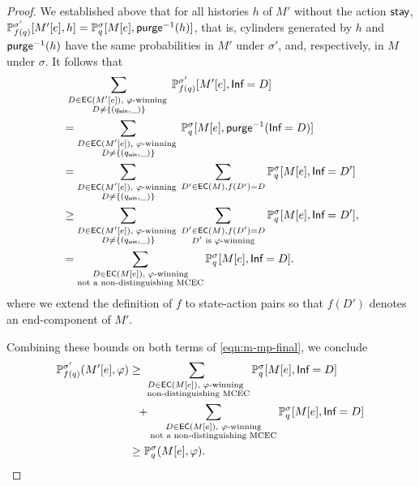 \documentclass[a4paper,USenglish,cleveref, autoref, thm-restate]{lipics-v2021}
\newcommand*{\pr}{\mathbb{P}}
\newcommand\ecs{\textrm{\sf EC}}
\newcommand\Inf{\textrm{\sf Inf}}
\def\winabsorb{q_{\sf win}}
\newcommand\purgeinv[1]{\textrm{\sf purge}^{-1}(#1)}
\def\actionstay{\textrm{\sf stay}}
\begin{document}
\begin{proof}
  We established above that for all histories $h$ of $M'$ without the action $\actionstay$,
  $\pr_{f(q)}^{\sigma'}[M'[e], h] = \pr_{q}^{\sigma}[M[e], \purgeinv{h}]$,
  that is, cylinders generated by $h$ and $\purgeinv{h}$ have the same probabilities in $M'$ under
  $\sigma'$, and, respectively, in $M$ under $\sigma$. 
  It follows that
  \begin{align*}
    &~\sum_{\substack{D \in \ecs(M'[e]), \text{ $\varphi$-winning } \\ D \neq \{(\winabsorb,\_)\} }}\pr_{f(q)}^{\sigma'}[M'[e], \Inf=D]\\
    &=\sum_{\substack{D \in \ecs(M'[e]), \text{ $\varphi$-winning } \\ D \neq \{(\winabsorb,\_)\} }}\pr_{q}^{\sigma}[M[e], \purgeinv{\Inf = D}]\\
    &= \sum_{\substack{D \in \ecs(M'[e]), \text{ $\varphi$-winning } \\ D \neq \{(\winabsorb,\_)\} }}\sum_{D' \in \ecs(M), f(D') = D} \pr_{q}^{\sigma}[M[e], \Inf = D']\\
    &\geq \sum_{\substack{D \in \ecs(M'[e]), \text{ $\varphi$-winning } \\ D \neq \{(\winabsorb,\_)\} }}\sum_{\substack{D' \in \ecs(M), f(D') = D\\ D' \text{ is $\varphi$-winning}}} \pr_{q}^{\sigma}[M[e], \Inf = D'],\\
    &=\sum_{\substack{D \in \ecs(M[e]), \text{ $\varphi$-winning} \\ \text{not a non-distinguishing MCEC}}} \pr_{q}^{\sigma}[M[e], \Inf = D].
  \end{align*}
  where we extend the definition of $f$ to state-action pairs so that $f(D')$ denotes an end-component of $M'$.

  Combining these bounds on both terms of \eqref{eqn:m-mp-final}, we conclude
  \begin{align*}
    \pr_{f(q)}^{\sigma'}(M'[e],\varphi) &\geq
    \sum_{\substack{D \in \ecs(M[e]), \text{ $\varphi$-winning }\\\text{ non-distinguishing MCEC}}} \pr_q^\sigma[M[e], \Inf=D] 
    \\ & ~~+  \sum_{\substack{D \in \ecs(M[e]), \text{ $\varphi$-winning} \\ \text{not a non-distinguishing MCEC}}} \pr_{q}^{\sigma}[M[e], \Inf = D]\\
    &\geq \pr_{q}^{\sigma}(M[e],\varphi).
  \end{align*}
\end{proof}
\end{document}

